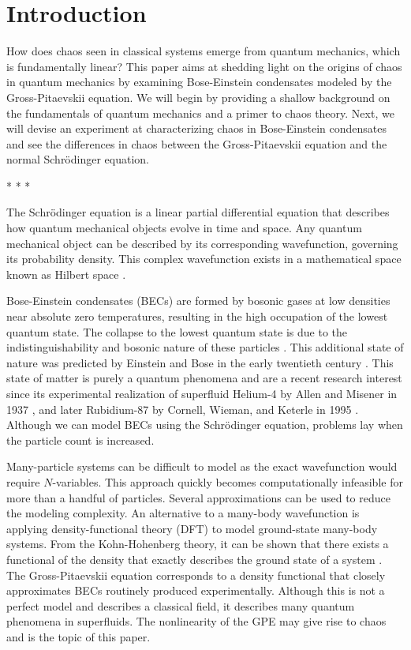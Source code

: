\addchapheadtotoc

\chapter{Introduction}
How does chaos seen in classical systems emerge from quantum mechanics, which is fundamentally linear? This paper aims at shedding light on the origins of chaos in quantum mechanics by examining Bose-Einstein condensates modeled by the Gross-Pitaevskii equation. We will begin by providing a shallow background on the fundamentals of quantum mechanics and a primer to chaos theory. Next, we will devise an experiment at characterizing chaos in Bose-Einstein condensates and see the differences in chaos between the Gross-Pitaevskii equation and the normal Schr\"odinger equation.

\begin{center}
	* * *
\end{center}

The Schr\"odinger equation is a linear partial differential equation that describes how quantum mechanical objects evolve in time and space. Any quantum mechanical object can be described by its corresponding wavefunction, governing its probability density.  This complex wavefunction exists in a mathematical space known as Hilbert space \cite{shankar2012principles}.

Bose-Einstein condensates (BECs) are formed by bosonic gases at low densities near absolute zero temperatures, resulting in the high occupation of the lowest quantum state. The collapse to the lowest quantum state is due to the indistinguishability and bosonic nature of these particles \cite{GouldTobochnik+2010}. This additional state of nature was predicted by Einstein and Bose in the early twentieth century \cite{einstein1924quantum}. This state of matter is purely a quantum phenomena and are a recent research interest since its experimental realization of superfluid Helium-4 by Allen and Misener in 1937 \cite{allen1938flow}, and later Rubidium-87 by Cornell, Wieman, and Keterle in 1995 \cite{ensher1996bose}. Although we can model BECs using the Schr\"odinger equation, problems lay when the particle count is increased.

Many-particle systems can be difficult to model as the exact wavefunction would require $N$-variables. This approach quickly becomes computationally infeasible for more than a handful of particles. Several approximations can be used to reduce the modeling complexity. An alternative to a many-body wavefunction is applying density-functional theory (DFT) to model ground-state many-body systems. From the Kohn-Hohenberg theory, it can be shown that there exists a functional of the density that exactly describes the ground state of a system \cite{HK:1964}. The Gross-Pitaevskii equation corresponds to a density functional that closely approximates BECs routinely produced experimentally. Although this is not a perfect model and describes a classical field, it describes many quantum phenomena in superfluids. The nonlinearity of the GPE may give rise to chaos and is the topic of this paper.


